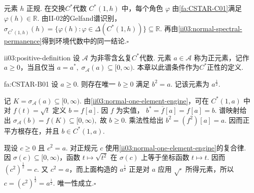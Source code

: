 \begin{FAProof}
元素 \(\displaystyle h\) 正规. 在交换\(\displaystyle C^*\)代数 \(\displaystyle C^*(1,h)\) 中，每个角色 \(\displaystyle\varphi\) 由\autoref{fa:CSTAR-C01}满足 \(\displaystyle\varphi(h)\in\mathbb R\). 由II-02的Gelfand谱识别，
\(\displaystyle \sigma_{C^*(1,h)}(h) =\{\varphi(h):\varphi\in\Delta(C^*(1,h))\} \subseteq\mathbb R.\)
再由\autoref{ii03:normal-spectral-permanence}得到环境代数中的同一结论.\hfill\(\square\)
\end{FAProof}

\begin{FADefinition}[A][正元素]{ii03:positive-definition}
设 \(\displaystyle\mathcal A\) 为非零含幺复\(\displaystyle C^*\)代数. 元素 \(\displaystyle a\in\mathcal A\) 称为正元素，记作 \(\displaystyle a\geqslant0\)，当且仅当
\(\displaystyle a=a^*, \; \sigma_{\mathcal A}(a)\subseteq[0,\infty).\)
本章以此谱条件作为\(\displaystyle C^*\)正性的定义.
\end{FADefinition}

\begin{FATheorem}[B][正元素的唯一正平方根]{fa:CSTAR-B01}
设 \(\displaystyle a\geqslant0\). 则存在唯一 \(\displaystyle b\geqslant0\) 满足
\(\displaystyle b^2=a.\)
记该元素为 \(\displaystyle a^{\frac{1}{2}}\).
\end{FATheorem}

\begin{FAProof}
记 \(\displaystyle K=\sigma_{\mathcal A}(a)\subseteq[0,\infty)\). 由\autoref{ii03:normal-one-element-engine}，可在 \(\displaystyle C^*(1,a)\) 中对 \(\displaystyle f(t)=\sqrt t\) 定义 \(\displaystyle b=f[a]\). 因 \(\displaystyle f\) 为实值，
\(\displaystyle b^*=\overline f[a]=f[a]=b.\)
谱映射给出
\(\displaystyle \sigma_{\mathcal A}(b)=f(K)\subseteq[0,\infty),\)
故 \(\displaystyle b\geqslant0\). 乘法性给出 \(\displaystyle b^2=(f^2)[a]=a\). 因而正平方根存在，并且 \(\displaystyle b\in C^*(1,a)\).

现设 \(\displaystyle c\geqslant0\) 且 \(\displaystyle c^2=a\). 对正规元 \(\displaystyle c\) 使用\autoref{ii03:normal-one-element-engine}的复合律. 因 \(\displaystyle\sigma(c)\subseteq[0,\infty)\)，函数 \(\displaystyle t\mapsto\sqrt{t^2}\) 在 \(\displaystyle\sigma(c)\) 上等于坐标函数 \(\displaystyle t\mapsto t\). 因而
\(\displaystyle (c^2)^{\frac{1}{2}}=c.\)
又 \(\displaystyle c^2=a\)，而上面构造的 \(\displaystyle a^{\frac{1}{2}}\) 正是对 \(\displaystyle a\) 应用 \(\displaystyle\sqrt{\cdot}\) 所得元素，所以
\(\displaystyle c=(c^2)^{\frac{1}{2}}=a^{\frac{1}{2}}.\)
唯一性成立.\hfill\(\square\)
\end{FAProof}

